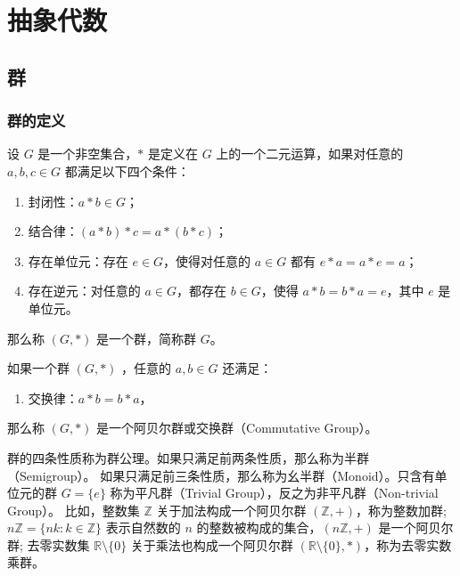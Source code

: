 \chapter{抽象代数}
\section{群}


\subsection{群的定义}

\begin{definition}[群 Group]
    设 $G$ 是一个非空集合，$*$ 是定义在 $G$ 上的一个二元运算，如果对任意的 $a, b, c\in G$ 都满足以下四个条件：
    \begin{enumerate}
        \item 封闭性：$a * b\in G$；
        \item 结合律：$(a * b) * c = a * (b * c)$；
        \item 存在单位元：存在 $e\in G$，使得对任意的 $a\in G$ 都有 $e * a = a * e = a$；
        \item 存在逆元：对任意的 $a\in G$，都存在 $b\in G$，使得 $a * b = b * a = e$，其中 $e$ 是单位元。
    \end{enumerate}
    那么称 $(G, *)$ 是一个群，简称群 $G$。
    \label{def:group}
\end{definition}
\vspace{1em}

\begin{definition}
    如果一个群 $(G, *)$ ，任意的 $a, b\in G$ 还满足：
    \begin{enumerate}
        \item 交换律：$a * b = b * a$，
    \end{enumerate}
    那么称 $(G, *)$ 是一个阿贝尔群或交换群（Commutative Group）。
    \label{def:abelian_group}
\end{definition}

\begin{note}
    群的四条性质称为群公理。如果只满足前两条性质，那么称为半群（Semigroup）。
    如果只满足前三条性质，那么称为幺半群（Monoid）。只含有单位元的群 $G=\{e\}$ 称为平凡群（Trivial Group），反之为非平凡群（Non-trivial Group）。
    比如，整数集 $\mathbb{Z}$ 关于加法构成一个阿贝尔群 $(\mathbb{Z}, +)$，称为整数加群;
    $n\mathbb{Z} = \{nk : k \in \mathbb{Z}\}$ 表示自然数的 $n$ 的整数被构成的集合，$(n\mathbb{Z}, +)$ 是一个阿贝尔群;
    去零实数集 $\mathbb{R}\setminus\{0\}$ 关于乘法也构成一个阿贝尔群 $(\mathbb{R}\setminus\{0\}, *)$，称为去零实数乘群。
\end{note}
\vspace{1em}

